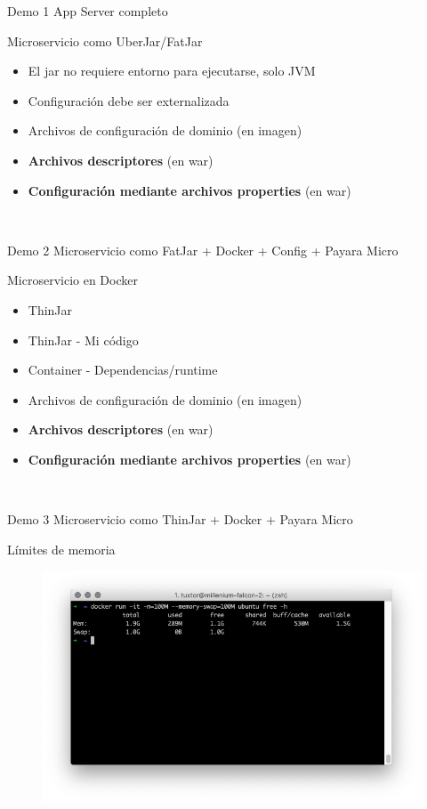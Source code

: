 \documentclass[aspectratio=169]{beamer}
\begin{document}
\begin{frame}{Demo 1}
App Server completo
\end{frame}


\begin{frame}{Microservicio como UberJar/FatJar}
    \begin{itemize}
        \item El jar no requiere entorno para ejecutarse, solo JVM
        \item Configuración debe ser externalizada
        \item Archivos de configuración de dominio (en imagen)
        \item \textbf{Archivos descriptores} (en war)
        \item \textbf{Configuración mediante archivos properties} (en war)
    \end{itemize}
\end{frame} 


\begin{frame}{Demo 2}
Microservicio como FatJar + Docker + Config + Payara Micro
\end{frame}

\begin{frame}{Microservicio en Docker}
    \begin{itemize}
        \item ThinJar
        \item ThinJar - Mi código
        \item Container - Dependencias/runtime
        \item Archivos de configuración de dominio (en imagen)
        \item \textbf{Archivos descriptores} (en war)
        \item \textbf{Configuración mediante archivos properties} (en war)
    \end{itemize}
\end{frame} 

\begin{frame}{Demo 3}
    Microservicio como ThinJar + Docker + Payara Micro
\end{frame}


\begin{frame}{Límites de memoria}
    \begin{figure}
        \centering
        \includegraphics[width=0.9\linewidth]{Images/dockermem.png}
        \label{fig:container1}
    \end{figure}
\end{frame}
\end{document}

